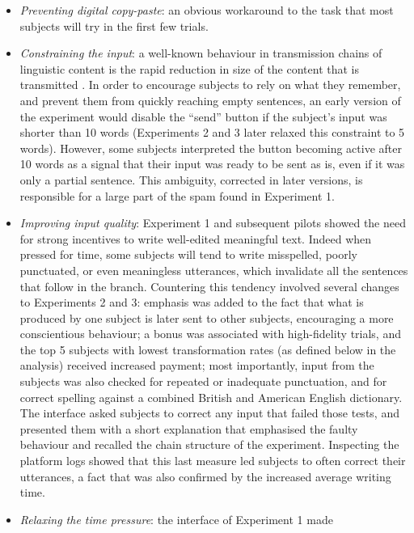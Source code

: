 \begin{itemize}
\item
  \emph{Preventing digital copy-paste}: an obvious workaround to the
  task that most subjects will try in the first few trials.
\item
  \emph{Constraining the input}: a well-known behaviour in transmission
  chains of linguistic content is the rapid reduction in size of the
  content that is transmitted
  \autocites{maxwell_remembering_1936}{bangerter_transformation_2000}{mesoudi_hierarchical_2004}.
  In order to encourage subjects to rely on what they remember, and
  prevent them from quickly reaching empty sentences, an early version
  of the experiment would disable the \enquote{send} button if the
  subject's input was shorter than 10 words (Experiments 2 and 3 later
  relaxed this constraint to 5 words). However, some subjects
  interpreted the button becoming active after 10 words as a signal that
  their input was ready to be sent as is, even if it was only a partial
  sentence. This ambiguity, corrected in later versions, is responsible
  for a large part of the spam found in Experiment 1.
\item
  \emph{Improving input quality}: Experiment 1 and subsequent pilots
  showed the need for strong incentives to write well-edited meaningful
  text. Indeed when pressed for time, some subjects will tend to write
  misspelled, poorly punctuated, or even meaningless utterances, which
  invalidate all the sentences that follow in the branch. Countering
  this tendency involved several changes to Experiments 2 and 3:
  emphasis was added to the fact that what is produced by one subject is
  later sent to other subjects, encouraging a more conscientious
  behaviour; a bonus was associated with high-fidelity trials, and the
  top 5 subjects with lowest transformation rates (as defined below in
  the analysis) received increased payment; most importantly, input from
  the subjects was also checked for repeated or inadequate punctuation,
  and for correct spelling against a combined British and American
  English dictionary. The interface asked subjects to correct any input
  that failed those tests, and presented them with a short explanation
  that emphasised the faulty behaviour and recalled the chain structure
  of the experiment. Inspecting the platform logs showed that this last
  measure led subjects to often correct their utterances, a fact that
  was also confirmed by the increased average writing time.
\item
  \emph{Relaxing the time pressure}: the interface of Experiment 1 made

\end{itemize}
